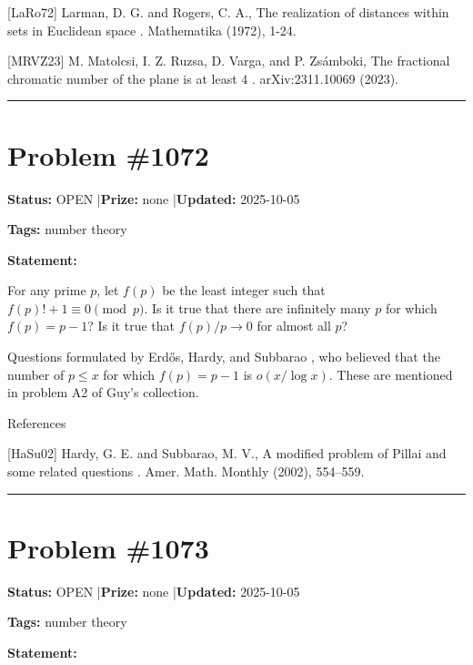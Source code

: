 \documentclass{article}
\begin{document}
[LaRo72] Larman, D. G. and Rogers, C. A., The realization of distances within sets in Euclidean space . Mathematika (1972), 1-24.

[MRVZ23] M. Matolcsi, I. Z. Ruzsa, D. Varga, and P. Zs\'{a}mboki, The fractional chromatic number of the plane is at least $4$ . arXiv:2311.10069 (2023).

\noindent\rule{\linewidth}{0.4pt}


\section{Problem \#1072}
\label{prob:1072}

\noindent\textbf{Status:} OPEN \quad|\quad \textbf{Prize:} none \quad|\quad \textbf{Updated:} 2025-10-05

\noindent\textbf{Tags:} number theory

\medskip

\noindent\textbf{Statement:}

For any prime $p$, let $f(p)$ be the least integer such that $f(p)!+1\equiv 0\pmod{p}$. Is it true that there are infinitely many $p$ for which $f(p)=p-1$? Is it true that $f(p)/p\to 0$ for almost all $p$?




Questions formulated by Erd\H{o}s, Hardy, and Subbarao \cite{HaSu02}, who believed that the number of $p\leq x$ for which $f(p)=p-1$ is $o(x/\log x)$. These are mentioned in problem A2 of Guy's collection.




References

[HaSu02] Hardy, G. E. and Subbarao, M. V., A modified problem of Pillai and some related questions . Amer. Math. Monthly (2002), 554--559.

\noindent\rule{\linewidth}{0.4pt}


\section{Problem \#1073}
\label{prob:1073}

\noindent\textbf{Status:} OPEN \quad|\quad \textbf{Prize:} none \quad|\quad \textbf{Updated:} 2025-10-05

\noindent\textbf{Tags:} number theory

\medskip

\noindent\textbf{Statement:}
\end{document}
